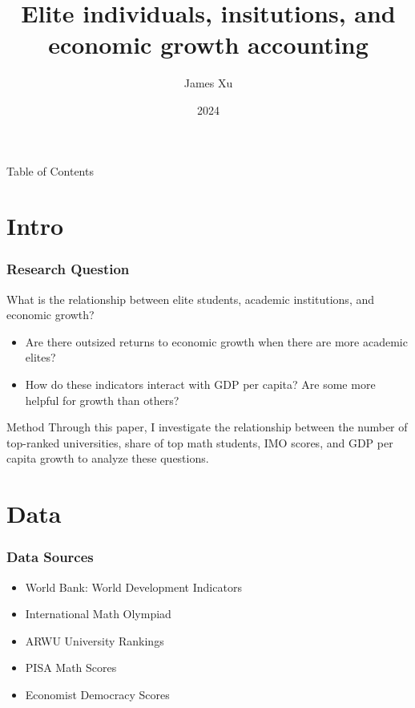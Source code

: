 \documentclass[10pt]{beamer}
\title{Elite individuals, insitutions, and economic growth accounting}
\author{James Xu}
\institute{ECON 442, Duke University}
\date{2024}
\begin{document}

\frame{\titlepage}

\begin{frame}{Table of Contents}
    \tableofcontents
\end{frame}
\section{Intro}
\begin{frame}
    \frametitle{Research Question}
    \begin{block}{What is the relationship between elite students, academic institutions, and economic growth?}
        \begin{itemize}
            \item Are there outsized returns to economic growth when there are more academic elites?
            \item How do these indicators interact with GDP per capita? Are some more helpful for growth than others?
        \end{itemize}
    \end{block}
    \begin{exampleblock}{Method}
        Through this paper, I investigate the relationship between the number of top-ranked universities, share of top math students,
        IMO scores, and GDP per capita growth to analyze these questions.
    \end{exampleblock}
\end{frame}

\section{Data}
\begin{frame}
\frametitle{Data Sources}
\begin{itemize}
    \item World Bank: World Development Indicators
    \item International Math Olympiad
    \item ARWU University Rankings
    \item PISA Math Scores
    \item Economist Democracy Scores
\end{itemize}
\end{frame}
\end{document}
